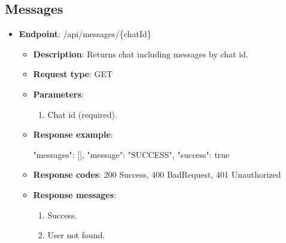 \subsection{Messages}\label{subsec: messages}
\begin{itemize}%
    \item \textbf{Endpoint}: /api/messages/\{chatId\}
    \begin{itemize}
        \item \textbf{Description}: Returns chat including messages by chat id.
        \item \textbf{Request type}: GET
        \item \textbf{Parameters}:
        \begin{enumerate}
            \item Chat id (required).
        \end{enumerate}
        \item \textbf{Response example}:
        \begin{spverbatim}
        {
            "messages": [],
            "message": "SUCCESS",
            "success": true
        }
        \end{spverbatim}
        \item \textbf{Response codes}: 200 Success, 400 BadRequest, 401 Unauthorized
        \item \textbf{Response messages}:
        \begin{enumerate}
            \item Success.
            \item User not found.
        \end{enumerate}
    \end{itemize}


\end{itemize}

